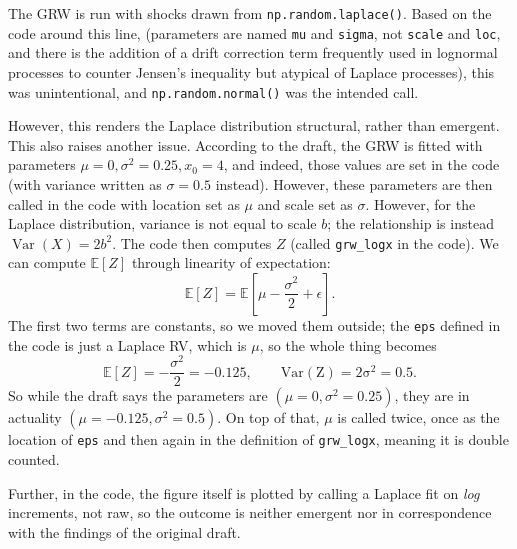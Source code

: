 \documentclass[twocolumn, letterpaper]{article}
\begin{document}
The GRW is run with shocks drawn from \texttt{np.random.laplace()}. Based on the code around this line, (parameters are named \texttt{mu} and \texttt{sigma}, not \texttt{scale} and \texttt{loc}, and there is the addition of a drift correction term frequently used in lognormal processes to counter Jensen's inequality but atypical of Laplace processes), this was unintentional, and \texttt{np.random.normal()} was the intended call. 

\begin{center}
\begin{minipage}{0.85\columnwidth}

\end{minipage}
\end{center}

However, this renders the Laplace distribution structural, rather than emergent. This also raises another issue. According to the draft, the GRW is fitted with parameters $\mu = 0, \sigma^2 = 0.25, x_0 = 4$, and indeed, those values are set in the code (with variance written as $\sigma = 0.5$ instead). However, these parameters are then called in the code with location set as $\mu$ and scale set as $\sigma$. However, for the Laplace distribution, variance is not equal to scale $b$; the relationship is instead $\operatorname{Var}(X) = 2b^2$. The code then computes $Z$ (called \texttt{grw\_logx} in the code). We can compute $\mathbb{E}[Z]$ through linearity of expectation:
\[
\mathbb{E}[Z] = \mathbb{E}[\mu - \frac{\sigma^2}{2}+\epsilon].
\]
The first two terms are constants, so we moved them outside; the \texttt{eps} defined in the code is just a Laplace RV, which is $\mu$, so the whole thing becomes 
\[
\mathbb{E}[Z] = -\frac{\sigma^2}{2}=-0.125, \qquad \operatorname{Var(Z) = 2\sigma^2 = 0.5}.
\]
So while the draft says the parameters are $(\mu = 0, \sigma^2 = 0.25)$, they are in actuality $(\mu = -0.125, \sigma^2 = 0.5)$. On top of that, $\mu$ is called twice, once as the location of \texttt{eps} and then again in the definition of \texttt{grw\_logx}, meaning it is double counted.

Further, in the code, the figure itself is plotted by calling a Laplace fit on \emph{log} increments, not raw, so the outcome is neither emergent nor in correspondence with the findings of the original draft. 

\begin{center}
\begin{minipage}{0.85\columnwidth}

\end{minipage}
\end{center}
\end{document}
